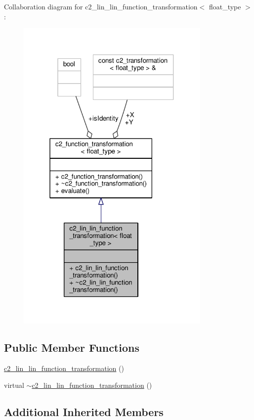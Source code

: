 Collaboration diagram for c2\+\_\+lin\+\_\+lin\+\_\+function\+\_\+transformation$<$ float\+\_\+type $>$\+:
\nopagebreak
\begin{figure}[H]
\begin{center}
\leavevmode
\includegraphics[width=268pt]{classc2__lin__lin__function__transformation__coll__graph}
\end{center}
\end{figure}
\subsection*{Public Member Functions}
\begin{DoxyCompactItemize}
\item 
\hyperlink{classc2__lin__lin__function__transformation_a84e792965908849de51ffc86d67c15ca}{c2\+\_\+lin\+\_\+lin\+\_\+function\+\_\+transformation} ()
\item 
virtual \hyperlink{classc2__lin__lin__function__transformation_a8df8ea05f39178871494c20a551404d7}{$\sim$c2\+\_\+lin\+\_\+lin\+\_\+function\+\_\+transformation} ()
\end{DoxyCompactItemize}
\subsection*{Additional Inherited Members}


